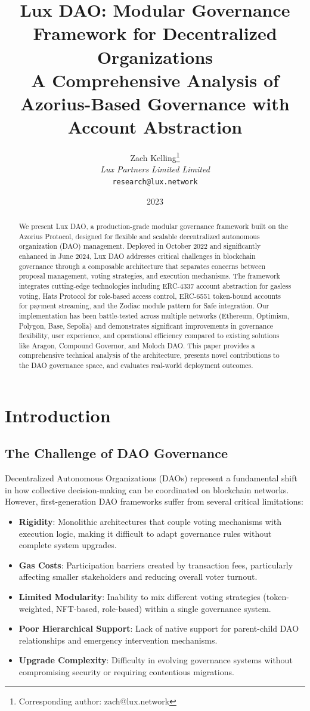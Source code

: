 \documentclass[11pt,a4paper]{article}
\title{\textbf{Lux DAO: Modular Governance Framework for Decentralized Organizations}\\
\large{A Comprehensive Analysis of Azorius-Based Governance with Account Abstraction}}
\author{
Zach Kelling\thanks{Corresponding author: zach@lux.network}\\
\textit{Lux Partners Limited Limited}\\
\texttt{research@lux.network}
}
\date{2023}
\begin{document}
\luxcoverpage

\begin{abstract}
We present Lux DAO, a production-grade modular governance framework built on the Azorius Protocol, designed for flexible and scalable decentralized autonomous organization (DAO) management. Deployed in October 2022 and significantly enhanced in June 2024, Lux DAO addresses critical challenges in blockchain governance through a composable architecture that separates concerns between proposal management, voting strategies, and execution mechanisms. The framework integrates cutting-edge technologies including ERC-4337 account abstraction for gasless voting, Hats Protocol for role-based access control, ERC-6551 token-bound accounts for payment streaming, and the Zodiac module pattern for Safe integration. Our implementation has been battle-tested across multiple networks (Ethereum, Optimism, Polygon, Base, Sepolia) and demonstrates significant improvements in governance flexibility, user experience, and operational efficiency compared to existing solutions like Aragon, Compound Governor, and Moloch DAO. This paper provides a comprehensive technical analysis of the architecture, presents novel contributions to the DAO governance space, and evaluates real-world deployment outcomes.
\end{abstract}

\section{Introduction}

\subsection{The Challenge of DAO Governance}

Decentralized Autonomous Organizations (DAOs) represent a fundamental shift in how collective decision-making can be coordinated on blockchain networks. However, first-generation DAO frameworks suffer from several critical limitations:

\begin{itemize}
    \item \textbf{Rigidity}: Monolithic architectures that couple voting mechanisms with execution logic, making it difficult to adapt governance rules without complete system upgrades.
    \item \textbf{Gas Costs}: Participation barriers created by transaction fees, particularly affecting smaller stakeholders and reducing overall voter turnout.
    \item \textbf{Limited Modularity}: Inability to mix different voting strategies (token-weighted, NFT-based, role-based) within a single governance system.
    \item \textbf{Poor Hierarchical Support}: Lack of native support for parent-child DAO relationships and emergency intervention mechanisms.
    \item \textbf{Upgrade Complexity}: Difficulty in evolving governance systems without compromising security or requiring contentious migrations.
\end{itemize}
\end{document}
